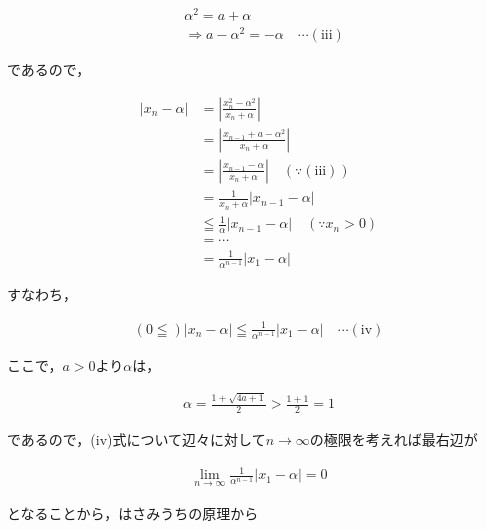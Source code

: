 \documentclass[autodetect-engine,ja=standard, 10.5pt, a4paper, titlepage]{bxjsarticle}
\begin{document}
\begin{enumerate}[1.]
\begin{enumerate}[(1)]
      \begin{fleqn}[20pt]
        \begin{align*}
          &\alpha^2 = a + \alpha\\
          &\Rightarrow a - \alpha^2 = -\alpha \quad\cdots\mathrm{(iii)}
        \end{align*}
      \end{fleqn}
    であるので，
      \begin{fleqn}[20pt]
        \begin{align*}
          |x_n - \alpha|
          &= \left|\frac{x_n^2 - \alpha^2}{x_n + \alpha}\right|\\
          &= \left|\frac{x_{n-1} + a - \alpha^2}{x_n + \alpha}\right|\\
          &= \left|\frac{x_{n-1} - \alpha}{x_n + \alpha}\right|\quad(\because \mathrm{(iii)})\\
          &= \frac{1}{x_n + \alpha} |x_{n-1} - \alpha|\\
          &\leqq \frac{1}{\alpha} |x_{n-1} - \alpha|\quad(\because x_n > 0)\\
          &= \cdots\\
          &= \frac{1}{\alpha^{n-1}}|x_1 - \alpha|
        \end{align*}
      \end{fleqn}
    すなわち，
      \begin{fleqn}[20pt]
        \begin{align*}
          (0 \leqq) |x_n - \alpha| \leqq \frac{1}{\alpha^{n-1}}|x_1 - \alpha|\quad \cdots \mathrm{(iv)}
        \end{align*}
      \end{fleqn}
    ここで，$a>0$より$\alpha$は，
      \begin{fleqn}[20pt]
        \begin{align*}
          \alpha = \frac{1 + \sqrt{4a + 1}}{2} > \frac{1 + 1}{2} = 1
        \end{align*}
      \end{fleqn}
    であるので，(iv)式について辺々に対して$n\to\infty$の極限を考えれば最右辺が
      \begin{fleqn}[20pt]
        \begin{align*}
          \lim_{n\to\infty}\frac{1}{\alpha^{n-1}}|x_1 - \alpha| = 0
        \end{align*}
      \end{fleqn}
    となることから，はさみうちの原理から
      \begin{fleqn}[20pt]
        \begin{align*}

\end{align*}
\end{fleqn}
\end{enumerate}
\end{enumerate}
\end{document}
